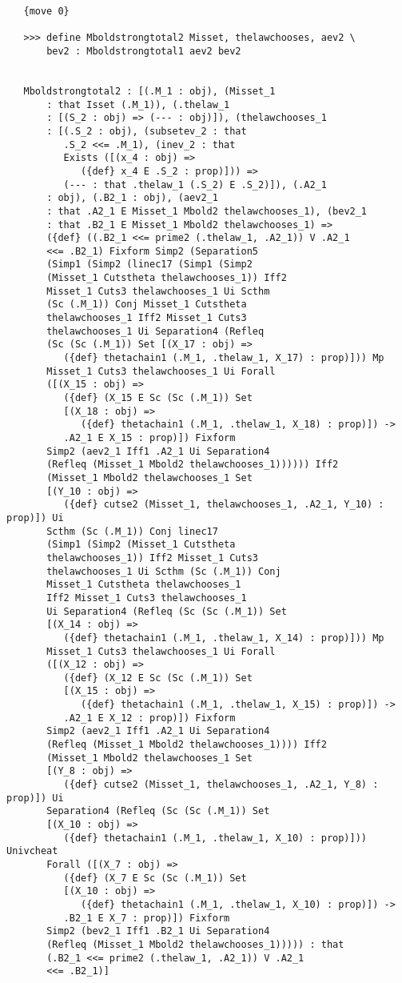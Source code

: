 \documentclass[12pt]{article}
\begin{document}
\begin{verbatim}
   {move 0}

   >>> define Mboldstrongtotal2 Misset, thelawchooses, aev2 \
       bev2 : Mboldstrongtotal1 aev2 bev2


   Mboldstrongtotal2 : [(.M_1 : obj), (Misset_1 
       : that Isset (.M_1)), (.thelaw_1 
       : [(S_2 : obj) => (--- : obj)]), (thelawchooses_1 
       : [(.S_2 : obj), (subsetev_2 : that 
          .S_2 <<= .M_1), (inev_2 : that 
          Exists ([(x_4 : obj) => 
             ({def} x_4 E .S_2 : prop)])) => 
          (--- : that .thelaw_1 (.S_2) E .S_2)]), (.A2_1 
       : obj), (.B2_1 : obj), (aev2_1 
       : that .A2_1 E Misset_1 Mbold2 thelawchooses_1), (bev2_1 
       : that .B2_1 E Misset_1 Mbold2 thelawchooses_1) => 
       ({def} ((.B2_1 <<= prime2 (.thelaw_1, .A2_1)) V .A2_1 
       <<= .B2_1) Fixform Simp2 (Separation5 
       (Simp1 (Simp2 (linec17 (Simp1 (Simp2 
       (Misset_1 Cutstheta thelawchooses_1)) Iff2 
       Misset_1 Cuts3 thelawchooses_1 Ui Scthm 
       (Sc (.M_1)) Conj Misset_1 Cutstheta 
       thelawchooses_1 Iff2 Misset_1 Cuts3 
       thelawchooses_1 Ui Separation4 (Refleq 
       (Sc (Sc (.M_1)) Set [(X_17 : obj) => 
          ({def} thetachain1 (.M_1, .thelaw_1, X_17) : prop)])) Mp 
       Misset_1 Cuts3 thelawchooses_1 Ui Forall 
       ([(X_15 : obj) => 
          ({def} (X_15 E Sc (Sc (.M_1)) Set 
          [(X_18 : obj) => 
             ({def} thetachain1 (.M_1, .thelaw_1, X_18) : prop)]) -> 
          .A2_1 E X_15 : prop)]) Fixform 
       Simp2 (aev2_1 Iff1 .A2_1 Ui Separation4 
       (Refleq (Misset_1 Mbold2 thelawchooses_1)))))) Iff2 
       (Misset_1 Mbold2 thelawchooses_1 Set 
       [(Y_10 : obj) => 
          ({def} cutse2 (Misset_1, thelawchooses_1, .A2_1, Y_10) : prop)]) Ui 
       Scthm (Sc (.M_1)) Conj linec17 
       (Simp1 (Simp2 (Misset_1 Cutstheta 
       thelawchooses_1)) Iff2 Misset_1 Cuts3 
       thelawchooses_1 Ui Scthm (Sc (.M_1)) Conj 
       Misset_1 Cutstheta thelawchooses_1 
       Iff2 Misset_1 Cuts3 thelawchooses_1 
       Ui Separation4 (Refleq (Sc (Sc (.M_1)) Set 
       [(X_14 : obj) => 
          ({def} thetachain1 (.M_1, .thelaw_1, X_14) : prop)])) Mp 
       Misset_1 Cuts3 thelawchooses_1 Ui Forall 
       ([(X_12 : obj) => 
          ({def} (X_12 E Sc (Sc (.M_1)) Set 
          [(X_15 : obj) => 
             ({def} thetachain1 (.M_1, .thelaw_1, X_15) : prop)]) -> 
          .A2_1 E X_12 : prop)]) Fixform 
       Simp2 (aev2_1 Iff1 .A2_1 Ui Separation4 
       (Refleq (Misset_1 Mbold2 thelawchooses_1)))) Iff2 
       (Misset_1 Mbold2 thelawchooses_1 Set 
       [(Y_8 : obj) => 
          ({def} cutse2 (Misset_1, thelawchooses_1, .A2_1, Y_8) : prop)]) Ui 
       Separation4 (Refleq (Sc (Sc (.M_1)) Set 
       [(X_10 : obj) => 
          ({def} thetachain1 (.M_1, .thelaw_1, X_10) : prop)])) Univcheat 
       Forall ([(X_7 : obj) => 
          ({def} (X_7 E Sc (Sc (.M_1)) Set 
          [(X_10 : obj) => 
             ({def} thetachain1 (.M_1, .thelaw_1, X_10) : prop)]) -> 
          .B2_1 E X_7 : prop)]) Fixform 
       Simp2 (bev2_1 Iff1 .B2_1 Ui Separation4 
       (Refleq (Misset_1 Mbold2 thelawchooses_1))))) : that 
       (.B2_1 <<= prime2 (.thelaw_1, .A2_1)) V .A2_1 
       <<= .B2_1)]



\end{verbatim}
\end{document}
